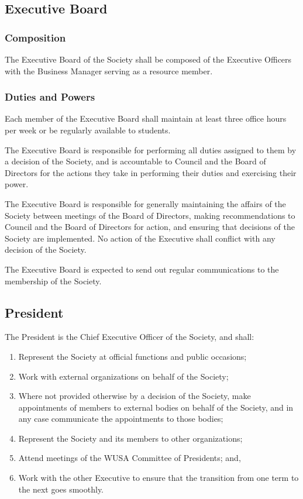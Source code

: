 \subsection{Executive Board}

\subsubsection{Composition}
The Executive Board of the Society shall be composed of the Executive Officers
with the Business Manager serving as a resource member.

\subsubsection{Duties and Powers}
Each member of the Executive Board shall maintain at least three office hours
per week or be regularly available to students.

The Executive Board is responsible for performing all duties assigned to them
by a decision of the Society, and is accountable to Council and the
Board of Directors for the actions they take in performing their duties and
exercising their power.

The Executive Board is responsible for generally maintaining the affairs of the
Society between meetings of the Board of Directors, making recommendations to
Council and the Board of Directors for action, and ensuring that
decisions of the Society are implemented.  No action of the Executive shall
conflict with any decision of the Society.

The Executive Board is expected to send out regular communications to the
membership of the Society.

\subsection{President}
The President is the Chief Executive Officer of the Society, and shall:
\begin{enumerate}
  \item Represent the Society at official functions and public occasions;
  \item Work with external organizations on behalf of the Society;
  \item Where not provided otherwise by a decision of the Society, make
    appointments of members to external bodies on behalf of the Society, and in
    any case communicate the appointments to those bodies;
  \item Represent the Society and its members to other organizations;
  \item Attend meetings of the WUSA Committee of Presidents; and,
  \item Work with the other Executive to ensure that the transition from one
    term to the next goes smoothly.
\end{enumerate}

